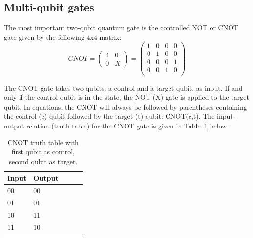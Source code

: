 \subsection{Multi-qubit gates}
\label{subsubsec:multiqubitgates}

The most important two-qubit quantum gate is the controlled NOT or CNOT gate given by the following 4x4 matrix:
\begin{equation}
CNOT = \begin{pmatrix}
 \mathbb{1} & 0 \\ 
 0 & X
 \end{pmatrix} = \begin{pmatrix}
 1 & 0 & 0 & 0 \\ 
 0 & 1 & 0 & 0 \\
 0 & 0 & 0 & 1 \\
 0 & 0 & 1 & 0 \\
 \end{pmatrix}
\end{equation}

The CNOT gate takes two qubits, a control and a target qubit, as input. If and only if the control qubit is in the \1 state, the NOT (X) gate is applied to the target qubit. In equations, the CNOT will always be followed by parentheses containing the control (c) qubit followed by the target (t) qubit: CNOT(c,t). The input-output relation (truth table) for the CNOT gate is given in Table~\ref{tab:cnottruthtable} below.

\begin{table}[H]
\begin{center}
\caption{CNOT truth table with first qubit as control, second qubit as target.}\vspace{1ex}
\label{tab:cnottruthtable}
\begin{tabular}{llccc}\hline
Input & Output \\ \hline
00 & 00 \\
01 & 01 \\
10 & 11 \\
11 & 10 \\ \hline
\end{tabular}
\end{center}
\end{table}

